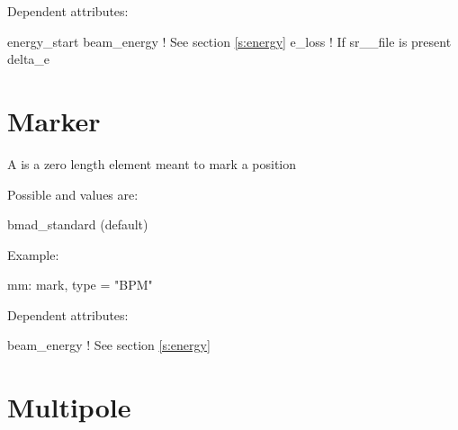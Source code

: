 \vskip0.2in \noindent
Dependent attributes:
\begin{example}
  energy\_start
  beam\_energy  ! See section \ref{s:energy}
  e\_loss       ! If sr_\wake\_file is present
  delta\_e
\end{example}

\section{Marker}
\label{s:mark}

A  is a zero length element meant to mark a position

\begin{table}[h]
\end{table}

\vskip0.2in \noindent
Possible  and  values are:
\vskip 0.01in
\begin{example}
  bmad\_standard (default)
\end{example}

\vskip0.2in \noindent
Example:
\begin{example}
  mm: mark, type = "BPM"
\end{example}

\vskip0.2in \noindent
Dependent attributes:
\begin{example}
  beam\_energy  ! See section \ref{s:energy}
\end{example}

\section{Multipole}
\label{s:mult}

